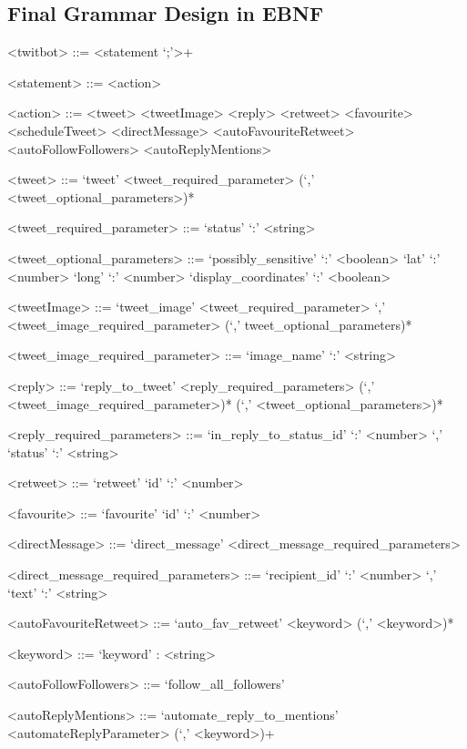 \begin{appendices}

\chapter{Final Grammar Design in EBNF}

\begin{grammar}
<twitbot> ::= <statement `;'>+ 

<statement> ::= <action> 

<action> ::= <tweet>
\alt <tweetImage>
\alt <reply>
\alt <retweet>
\alt <favourite>
\alt <scheduleTweet>
\alt <directMessage>
\alt <autoFavouriteRetweet>
\alt <autoFollowFollowers>
\alt <autoReplyMentions>

<tweet> ::= `tweet' <tweet_required_parameter> (`,' <tweet_optional_parameters>)*

<tweet_required_parameter> ::= `status' `:' <string>

<tweet_optional_parameters> ::= `possibly_sensitive' `:' <boolean>
\alt `lat' `:' <number>
\alt `long' `:' <number>
\alt `display_coordinates' `:' <boolean>

<tweetImage> ::= `tweet_image' <tweet_required_parameter> `,' <tweet_image_required_parameter> (`,' tweet_optional_parameters)*

<tweet_image_required_parameter> ::= `image_name' `:' <string>

<reply> ::= `reply_to_tweet' <reply_required_parameters> (`,' <tweet_image_required_parameter>)* (`,' <tweet_optional_parameters>)*

<reply_required_parameters> ::= `in_reply_to_status_id' `:' <number> `,' `status' `:' <string>

<retweet> ::= `retweet' `id' `:' <number>

<favourite> ::= `favourite' `id' `:' <number>

<directMessage> ::= `direct_message' <direct_message_required_parameters>

<direct_message_required_parameters> ::= `recipient_id' `:' <number> `,' `text' `:' <string>

<autoFavouriteRetweet> ::= `auto_fav_retweet' <keyword> (`,' <keyword>)* 

<keyword> ::= `keyword' : <string>

<autoFollowFollowers> ::= `follow_all_followers'

<autoReplyMentions> ::= `automate_reply_to_mentions' <automateReplyParameter> (`,' <keyword>)+


\end{grammar}
\end{appendices}
